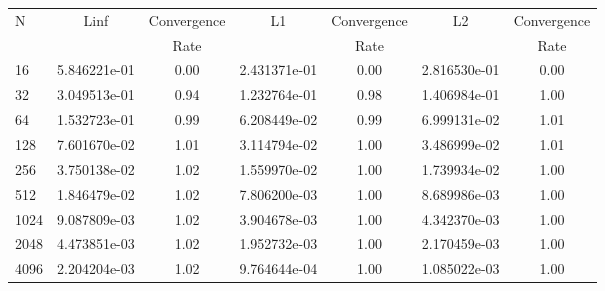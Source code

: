 \documentclass[12pt]{article}
\begin{document}
	\begin{tabular}{l|c|c|c|c|c|c}
		N&Linf&Convergence&L1&Convergence&L2&Convergence\\
		&&Rate&&Rate&&Rate\\
		\hline
		16&5.846221e-01&0.00&2.431371e-01&0.00&2.816530e-01&0.00\\
		\hline
		32&3.049513e-01&0.94&1.232764e-01&0.98&1.406984e-01&1.00\\
		\hline
		64&1.532723e-01&0.99&6.208449e-02&0.99&6.999131e-02&1.01\\
		\hline
		128&7.601670e-02&1.01&3.114794e-02&1.00&3.486999e-02&1.01\\
		\hline
		256&3.750138e-02&1.02&1.559970e-02&1.00&1.739934e-02&1.00\\
		\hline
		512&1.846479e-02&1.02&7.806200e-03&1.00&8.689986e-03&1.00\\
		\hline
		1024&9.087809e-03&1.02&3.904678e-03&1.00&4.342370e-03&1.00\\
		\hline
		2048&4.473851e-03&1.02&1.952732e-03&1.00&2.170459e-03&1.00\\
		\hline
		4096&2.204204e-03&1.02&9.764644e-04&1.00&1.085022e-03&1.00\\
	\end{tabular}
\end{document}
